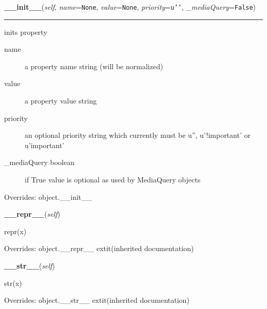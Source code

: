 \hspace{.8\funcindent}\begin{boxedminipage}{\funcwidth}

    \raggedright \textbf{\_\_init\_\_}(\textit{self}, \textit{name}={\tt None}, \textit{value}={\tt None}, \textit{priority}={\tt \texttt{u'}\texttt{}\texttt{'}}, \textit{\_mediaQuery}={\tt False})

    \vspace{-1.5ex}

    \rule{\textwidth}{0.5\fboxrule}
\setlength{\parskip}{2ex}

inits property
\begin{description}
\item[{name}] \leavevmode 
a property name string (will be normalized)

\item[{value}] \leavevmode 
a property value string

\item[{priority}] \leavevmode 
an optional priority string which currently must be u'',
u'!important' or u'important'

\item[{{\_}mediaQuery boolean}] \leavevmode 
if True value is optional as used by MediaQuery objects

\end{description}
\setlength{\parskip}{1ex}
      Overrides: object.\_\_init\_\_

    \end{boxedminipage}

    \vspace{0.5ex}

\hspace{.8\funcindent}\begin{boxedminipage}{\funcwidth}

    \raggedright \textbf{\_\_repr\_\_}(\textit{self})

\setlength{\parskip}{2ex}
    repr(x)

\setlength{\parskip}{1ex}
      Overrides: object.\_\_repr\_\_ 	extit{(inherited documentation)}

    \end{boxedminipage}

    \vspace{0.5ex}

\hspace{.8\funcindent}\begin{boxedminipage}{\funcwidth}

    \raggedright \textbf{\_\_str\_\_}(\textit{self})

\setlength{\parskip}{2ex}
    str(x)

\setlength{\parskip}{1ex}
      Overrides: object.\_\_str\_\_ 	extit{(inherited documentation)}

    \end{boxedminipage}


